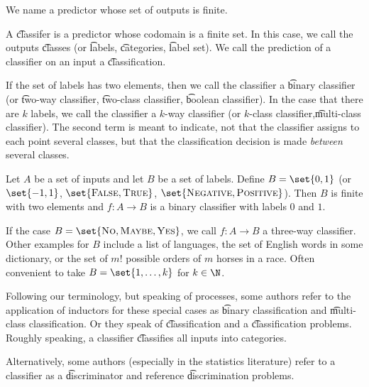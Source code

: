 
We name a predictor whose set of outputs is finite.

A \t{classifer} is a predictor whose codomain is a finite set.
In this case, we call the outputs \t{classes} (or \t{labels}, \t{categories}, \t{label set}).
We call the prediction of a classifier on an input a \t{classification}.

If the set of labels has two elements, then we call the classifier a \t{binary classifier} (or \t{two-way classifier}, \t{two-class classifier}, \t{boolean classifier}).
In the case that there are $k$ labels, we call the classifier a \t{$k$-way classifier} (or \t{$k$-class classifier},\t{multi-class classifier}).
The second term is meant to indicate, not that the classifier assigns to each point several classes, but that the classification decision is made \textit{between} several classes.

Let $A$ be a set of inputs and let $B$ be a set of labels.
Define $B = \set{0, 1}$ (or $\set{-1,1 }$, $\set{\textsc{False}, \textsc{True}}$, $\set{\textsc{Negative}, \textsc{Positive}}$).
Then $B$ is finite with two elements and $f: A \to B$ is a binary classifier with labels $0$ and $1$.

If the case $B = \set{\text{\textsc{No}}, \textsc{Maybe}, \textsc{Yes}}$, we call $f: A \to B$ a three-way classifier.
Other examples for $B$ include a list of languages, the set of English words in some dictionary, or the set of $m!$ possible orders of $m$ horses in a race.
Often convenient to take $B = \set{1, \dots, k}$ for $k \in \N$.

Following our terminology, but speaking of processes, some authors refer to the application of inductors for these special cases as \t{binary classification} and \t{multi-class classification}.
Or they speak of \t{classification} and a \t{classification problems}.
Roughly speaking, a classifier \t{classifies} all inputs into categories.

Alternatively, some authors (especially in the statistics literature) refer to a classifier as a \t{discriminator} and reference \t{discrimination problems}.
